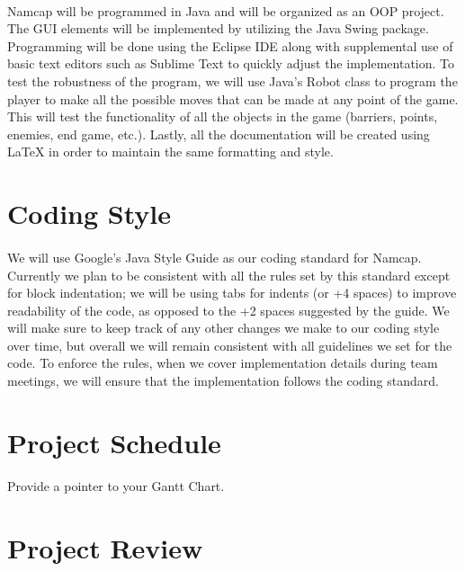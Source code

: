 \documentclass{article}
\begin{document}
\paragraph{}
Namcap will be programmed in Java and will be organized as an OOP project. The GUI elements will be implemented by utilizing the Java Swing package. Programming will be done using the Eclipse IDE along with supplemental use of basic text editors such as Sublime Text to quickly adjust the implementation. To test the robustness of the program, we will use Java's Robot class to program the player to make all the possible moves that can be made at any point of the game. This will test the functionality of all the objects in the game (barriers, points, enemies, end game, etc.). Lastly, all the documentation will be created using LaTeX in order to maintain the same formatting and style.

\section{Coding Style}

\paragraph{}
We will use Google's Java Style Guide as our coding standard for Namcap. Currently we plan to be consistent with all the rules set by this standard except for block indentation; we will be using tabs for indents (or +4 spaces) to improve readability of the code, as opposed to the +2 spaces suggested by the guide. We will make sure to keep track of any other changes we make to our coding style over time, but overall we will remain consistent with all guidelines we set for the code. To enforce the rules, when we cover implementation details during team meetings, we will ensure that the implementation follows the coding standard.

\section{Project Schedule}

Provide a pointer to your Gantt Chart.

\section{Project Review}
\end{document}

